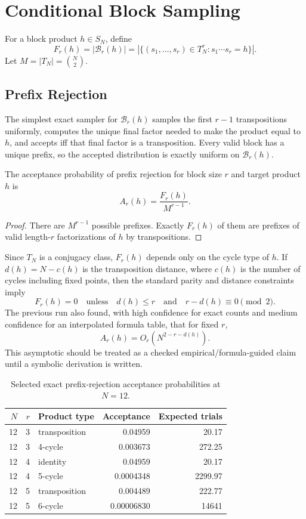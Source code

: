 \section{Conditional Block Sampling}

For a block product $h\in S_N$, define
\[
  F_r(h) = |\mathcal{B}_r(h)|
  =
  |\{(s_1,\ldots,s_r)\in T_N^r : s_1\cdots s_r=h\}|.
\]
Let $M=|T_N|=\binom{N}{2}$.

\subsection{Prefix Rejection}

The simplest exact sampler for $\mathcal{B}_r(h)$ samples the first $r-1$
transpositions uniformly, computes the unique final factor needed to make the
product equal to $h$, and accepts iff that final factor is a transposition.
Every valid block has a unique prefix, so the accepted distribution is exactly
uniform on $\mathcal{B}_r(h)$.

\begin{lemma}
The acceptance probability of prefix rejection for block size $r$ and target
product $h$ is
\[
  A_r(h) = \frac{F_r(h)}{M^{r-1}}.
\]
\end{lemma}

\begin{proof}
There are $M^{r-1}$ possible prefixes.  Exactly $F_r(h)$ of them are prefixes
of valid length-$r$ factorizations of $h$ by transpositions.
\end{proof}

Since $T_N$ is a conjugacy class, $F_r(h)$ depends only on the cycle type of
$h$.  If $d(h)=N-c(h)$ is the transposition distance, where $c(h)$ is the
number of cycles including fixed points, then the standard parity and distance
constraints imply
\[
  F_r(h)=0
  \quad\text{unless}\quad
  d(h)\leq r
  \quad\text{and}\quad
  r-d(h)\equiv 0 \pmod 2.
\]
The previous run also found, with high confidence for exact counts and medium
confidence for an interpolated formula table, that for fixed $r$,
\[
  A_r(h)=O_r\left(N^{2-r-d(h)}\right).
\]
This asymptotic should be treated as a checked empirical/formula-guided claim
until a symbolic derivation is written.

\begin{table}[ht]
\centering
\begin{tabular}{rrlrr}
\toprule
$N$ & $r$ & Product type & Acceptance & Expected trials \\
\midrule
12 & 3 & transposition & 0.04959 & 20.17 \\
12 & 3 & 4-cycle & 0.003673 & 272.25 \\
12 & 4 & identity & 0.04959 & 20.17 \\
12 & 4 & 5-cycle & 0.0004348 & 2299.97 \\
12 & 5 & transposition & 0.004489 & 222.77 \\
12 & 5 & 6-cycle & 0.00006830 & 14641 \\
\bottomrule
\end{tabular}
\caption{Selected exact prefix-rejection acceptance probabilities at $N=12$.}
\label{tab:prefix-rejection}
\end{table}

